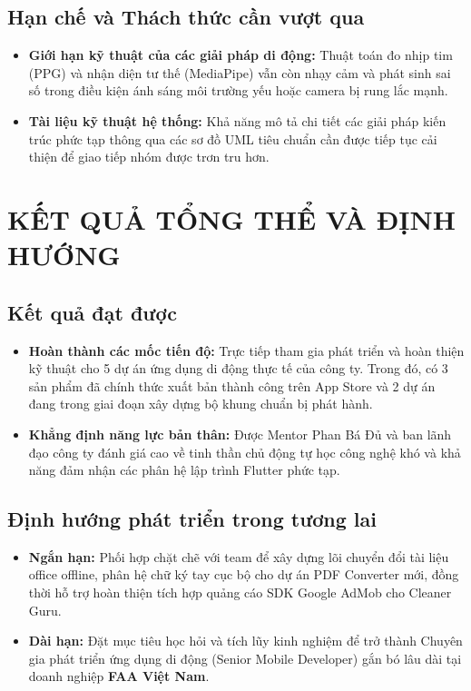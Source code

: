 \documentclass[12pt, a4paper]{article}
\begin{document}
\subsection{Hạn chế và Thách thức cần vượt qua}
\begin{itemize}
    \item \textbf{Giới hạn kỹ thuật của các giải pháp di động:} Thuật toán đo nhịp tim (PPG) và nhận diện tư thế (MediaPipe) vẫn còn nhạy cảm và phát sinh sai số trong điều kiện ánh sáng môi trường yếu hoặc camera bị rung lắc mạnh.
    \item \textbf{Tài liệu kỹ thuật hệ thống:} Khả năng mô tả chi tiết các giải pháp kiến trúc phức tạp thông qua các sơ đồ UML tiêu chuẩn cần được tiếp tục cải thiện để giao tiếp nhóm được trơn tru hơn.
\end{itemize}

\section{KẾT QUẢ TỔNG THỂ VÀ ĐỊNH HƯỚNG}

\subsection{Kết quả đạt được}
\begin{itemize}
    \item \textbf{Hoàn thành các mốc tiến độ:} Trực tiếp tham gia phát triển và hoàn thiện kỹ thuật cho 5 dự án ứng dụng di động thực tế của công ty. Trong đó, có 3 sản phẩm đã chính thức xuất bản thành công trên App Store và 2 dự án đang trong giai đoạn xây dựng bộ khung chuẩn bị phát hành.
    \item \textbf{Khẳng định năng lực bản thân:} Được Mentor Phan Bá Đủ và ban lãnh đạo công ty đánh giá cao về tinh thần chủ động tự học công nghệ khó và khả năng đảm nhận các phân hệ lập trình Flutter phức tạp.
\end{itemize}

\subsection{Định hướng phát triển trong tương lai}
\begin{itemize}
    \item \textbf{Ngắn hạn:} Phối hợp chặt chẽ với team để xây dựng lõi chuyển đổi tài liệu office offline, phân hệ chữ ký tay cục bộ cho dự án PDF Converter mới, đồng thời hỗ trợ hoàn thiện tích hợp quảng cáo SDK Google AdMob cho Cleaner Guru.
    \item \textbf{Dài hạn:} Đặt mục tiêu học hỏi và tích lũy kinh nghiệm để trở thành Chuyên gia phát triển ứng dụng di động (Senior Mobile Developer) gắn bó lâu dài tại doanh nghiệp \textbf{FAA Việt Nam}.
\end{itemize}
\end{document}
